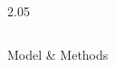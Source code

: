 \documentclass[final,12pt]{beamer}
\newlength{\colwidth}
\newcommand{\numData}{\ensuremath{t}}
\newcommand{\modeInd}{\ensuremath{k}}
\newcommand{\ModeInd}{\ensuremath{\MakeUppercase{\modeInd}}}
\newcommand{\singleData}[1]{\ensuremath{#1_{\numData}}}
\newcommand{\mode}[1]{\ensuremath{#1_{\modeInd}}}
\newcommand{\x}{\ensuremath{\mathbf{x}}}
\newcommand{\y}{\ensuremath{y}}
\newcommand{\singleInput}{\ensuremath{\x_{\numData-1}}}
\newcommand{\singleOutput}{\ensuremath{\singleData{\y}}}
\newcommand{\modeVar}{\ensuremath{\alpha}}
\newcommand{\gatingFunc}{\ensuremath{h}}
\newcommand{\latentFunc}{\ensuremath{f}}
\newcommand{\gatingParamsK}{\ensuremath{\mode{\bm\phi}}}
\newcommand{\expertParamsK}{\ensuremath{\mode{\bm\theta}}}
\newcommand{\timeInd}{\ensuremath{t}}
\newcommand{\TimeInd}{\ensuremath{\MakeUppercase{\timeInd}}}
\renewcommand{\mode}[1]{\ensuremath{#1_{\modeInd}}}
\renewcommand{\numData}{\ensuremath{n}}
\renewcommand{\singleOutput}{\ensuremath{y_{\numData}}}
\renewcommand{\singleInput}{\ensuremath{\mathbf{x}_{\numData}}}
\newcommand{\expertInducingInput}{\ensuremath{\mode{\bm{\zeta}}}}
\newcommand{\expertInducingOutput}{\ensuremath{\mode{\latentFunc}(\expertInducingInput)}}
\newcommand{\gatingInducingInput}{\ensuremath{\bm{\xi}}}
\newcommand{\gatingInducingOutput}{\ensuremath{\mode{\gatingFunc}(\gatingInducingInput)}}
\renewcommand{\numData}{\ensuremath{t}}
\renewcommand{\singleInput}{\ensuremath{\hat{\mathbf{s}}_{\timeInd}}}
\renewcommand{\singleOutput}{\ensuremath{\Delta\mathbf{s}_{\timeInd+1}}}
\begin{document}
\begin{frame}[t]
\begin{columns}[t]
\begin{column}{2.05\colwidth}
\begin{columns}[t]
\begin{column}{\colwidth}









  \begin{block}{Model \& Methods}


\end{block}
\end{column}
\end{columns}
\end{column}
\end{columns}
\end{frame}
\end{document}
